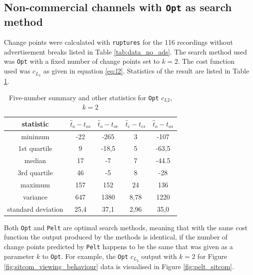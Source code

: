 \subsection{Non-commercial channels with \texttt{Opt} as search method} \label{sec:results_opt}

Change points were calculated with \texttt{ruptures} for the 116 recordings without advertisement breaks listed in Table \ref{tab:data_no_ads}. The search method used was \texttt{Opt} with a fixed number of change points set to $k=2$. The cost function used was $c_{L_2}$ as given in equation \ref{eq:l2}. Statistics of the result are listed in Table \ref{tab:statistics_opt}.

\begin{table}[h]
    \begin{center}
    \begin{tabular}{|c|c|c|c|c|}%
        \hline
        \textbf{statistic} & $\hat{t}_o-t_{os}$ & $\hat{t}_o-t_{oe}$ & $\hat{t}_c-t_{cs}$ & $\hat{t}_o-t_{os}$  \\ \hline
        minimum & -22 & -265 & 3 & -107\\ \hline
        1st quartile & 9 & -18,5 & 5 & -63,5\\ \hline
        median & 17 & -7 & 7 & -44.5\\ \hline
        3rd quartile & 46 & -5 & 8 & -28 \\ \hline
        maximum & 157 & 152	& 24 & 136\\ \hline
        variance & 647 & 1380	& 8,78 & 1220\\ \hline
        standard deviation & 25,4 & 37,1 & 2,96 & 35,0\\ \hline
    \end{tabular}
    \end{center}
    \caption{Five-number summary and other statistics for \texttt{Opt} $c_{L2}$, $k=2$}
    \label{tab:statistics_opt}
\end{table}

Both \texttt{Opt} and \texttt{Pelt} are optimal search methods, meaning that with the same cost function the output produced by the methods is identical, if the number of change points predicted by \texttt{Pelt} happens to be the same that was given as a parameter $k$ to \texttt{Opt}. For example, the \texttt{Opt} $c_{L_2}$ output with $k=2$ for Figure \ref{fig:sitcom_viewing_behaviour} data is visualised in Figure \ref{fig:pelt_sitcom}.

